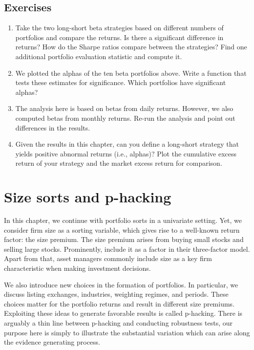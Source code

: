 \documentclass[
]{krantz}
\providecommand{\tightlist}{%
  \setlength{\itemsep}{0pt}\setlength{\parskip}{0pt}}
\begin{document}
\hypertarget{exercises-3}{%
\section{Exercises}\label{exercises-3}}

\begin{enumerate}
\def\labelenumi{\arabic{enumi}.}
\tightlist
\item
  Take the two long-short beta strategies based on different numbers of portfolios and compare the returns. Is there a significant difference in returns? How do the Sharpe ratios compare between the strategies? Find one additional portfolio evaluation statistic and compute it.
\item
  We plotted the alphas of the ten beta portfolios above. Write a function that tests these estimates for significance. Which portfolios have significant alphas?
\item
  The analysis here is based on betas from daily returns. However, we also computed betas from monthly returns. Re-run the analysis and point out differences in the results.
\item
  Given the results in this chapter, can you define a long-short strategy that yields positive abnormal returns (i.e., alphas)? Plot the cumulative excess return of your strategy and the market excess return for comparison.
\end{enumerate}

\hypertarget{size-sorts-and-p-hacking}{%
\chapter{Size sorts and p-hacking}\label{size-sorts-and-p-hacking}}

In this chapter, we continue with portfolio sorts in a univariate setting. Yet, we consider firm size as a sorting variable, which gives rise to a well-known return factor: the size premium. The size premium arises from buying small stocks and selling large stocks. Prominently, \citet{Fama1993} include it as a factor in their three-factor model. Apart from that, asset managers commonly include size as a key firm characteristic when making investment decisions.

We also introduce new choices in the formation of portfolios. In particular, we discuss listing exchanges, industries, weighting regimes, and periods. These choices matter for the portfolio returns and result in different size premiums. Exploiting these ideas to generate favorable results is called p-hacking.
There is arguably a thin line between p-hacking and conducting robustness tests, our purpose here is simply to illustrate the substantial variation which can arise along the evidence generating process.
\end{document}
